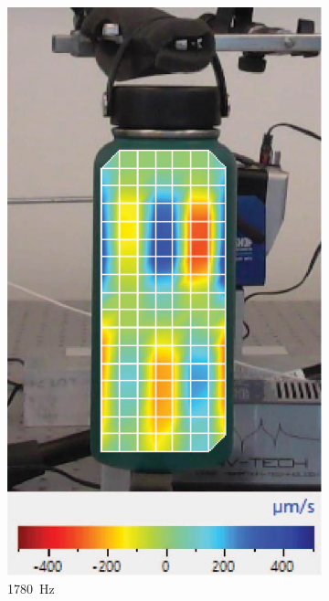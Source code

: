 \documentclass[twoside,a4paper]{article}
\begin{document}
\begin{figure}[!t]
\begin{subfigure}[b]{.32\columnwidth}
         \includegraphics[width=\columnwidth]{Paper/Figures/Water_1780.jpg}
         \caption{1780\ Hz}
    \end{subfigure}
    \begin{subfigure}[b]{.32\columnwidth}
         \centering

\end{subfigure}
\end{figure}
\end{document}
